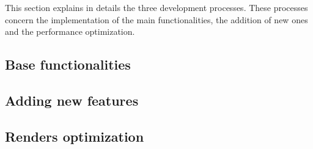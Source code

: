 This section explains in details the three development processes. These processes concern the implementation of the main functionalities, the addition of new ones and the performance optimization.
\subsection{Base functionalities}
\label{subsec:base_functionalities}


\subsection{Adding new features}
\label{subsec:adding_new_features}


\subsection{Renders optimization}
\label{subsec:renders_optimization}


